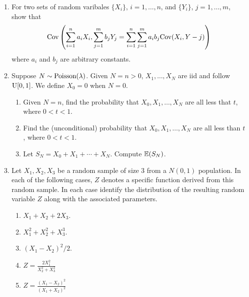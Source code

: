 \documentclass[titlepage]{article}
\begin{document}
\begin{enumerate}
\item For two sets of random varibales $\{X_i\}$, $i = 1, \ldots, n$, and $\{Y_i\}$, $j = 1, \ldots, m$, show that
\[\text{Cov}\left( \sum_{i=1}^n a_i X_i, \sum_{j=1}^m b_j Y_j = \sum_{i=1}^n \sum_{j=1}^m a_i b_j \text{Cov}(X_i, Y-j)\right)\]
where $a_i$ and $b_j$ are arbitrary constants.

\item Suppose $N \sim \text{Poisson}(\lambda)$. Given $N = n > 0$, $X_1, \ldots, X_N$ are iid and follow $\text{U}[0, 1]$. We define $X_0 = 0$ when $N = 0$.
  \begin{enumerate}
  \item Given $N = n$, find the probability that $X_0, X_1, \ldots, X_N$ are all less that $t$, where $0 < t < 1$.

  \item Find the (unconditional) probability that $X_0, X_1, \ldots, X_N$ are all less than $t$, where $0 < t < 1$.

  \item Let $S_N = X_0 + X_1 + \cdots + X_N$. Compute $\mathbb{E}(S_N)$.
  \end{enumerate}

\item Let $X_1, X_2, X_3$ be a random sample of size 3 from a $N(0, 1)$ population. In each of the following cases, $Z$ denotes a specific function derived from this random sample. In each case identify the distribution of the resulting random variable $Z$ along with the associated parameters.
  \begin{enumerate}
  \item $X_1 + X_2 + 2X_3$.

  \item $X_1^2 + X_2^2 + X_3^3$.

  \item $(X_1 - X_2)^2 / 2$.

  \item $Z = \frac{2X_1^2}{X_2^2 + X_3^2}$

  \item $Z = \frac{(X_1 - X_2)^2}{(X_1 + X_2)^2}$
  \end{enumerate}
\end{enumerate}
\end{document}

